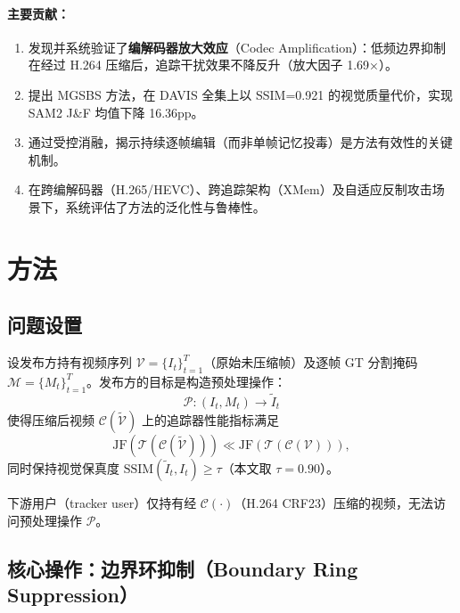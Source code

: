 \documentclass[UTF8,a4paper,12pt]{ctexart}
\begin{document}
\paragraph{主要贡献：}
\begin{enumerate}
  \item 发现并系统验证了\textbf{编解码器放大效应}（Codec Amplification）：低频边界抑制在经过 H.264 压缩后，追踪干扰效果不降反升（放大因子 1.69×）。
  \item 提出 MGSBS 方法，在 DAVIS 全集上以 SSIM=0.921 的视觉质量代价，实现 SAM2 J\&F 均值下降 16.36pp。
  \item 通过受控消融，揭示持续逐帧编辑（而非单帧记忆投毒）是方法有效性的关键机制。
  \item 在跨编解码器（H.265/HEVC）、跨追踪架构（XMem）及自适应反制攻击场景下，系统评估了方法的泛化性与鲁棒性。
\end{enumerate}

\section{方法}
\label{sec:method}

\subsection{问题设置}

设发布方持有视频序列 $\mathcal{V} = \{I_t\}_{t=1}^{T}$（原始未压缩帧）及逐帧 GT 分割掩码 $\mathcal{M} = \{M_t\}_{t=1}^{T}$。发布方的目标是构造预处理操作：
\begin{equation}
  \mathcal{P}: (I_t, M_t) \rightarrow \tilde{I}_t
\end{equation}
使得压缩后视频 $\mathcal{C}(\tilde{\mathcal{V}})$ 上的追踪器性能指标满足
\begin{equation}
  \text{JF}\!\left(\mathcal{T}(\mathcal{C}(\tilde{\mathcal{V}}))\right) \ll \text{JF}\!\left(\mathcal{T}(\mathcal{C}(\mathcal{V}))\right),
\end{equation}
同时保持视觉保真度 $\text{SSIM}(\tilde{I}_t, I_t) \geq \tau$（本文取 $\tau = 0.90$）。

下游用户（tracker user）仅持有经 $\mathcal{C}(\cdot)$（H.264 CRF23）压缩的视频，无法访问预处理操作 $\mathcal{P}$。

\subsection{核心操作：边界环抑制（Boundary Ring Suppression）}
\end{document}
